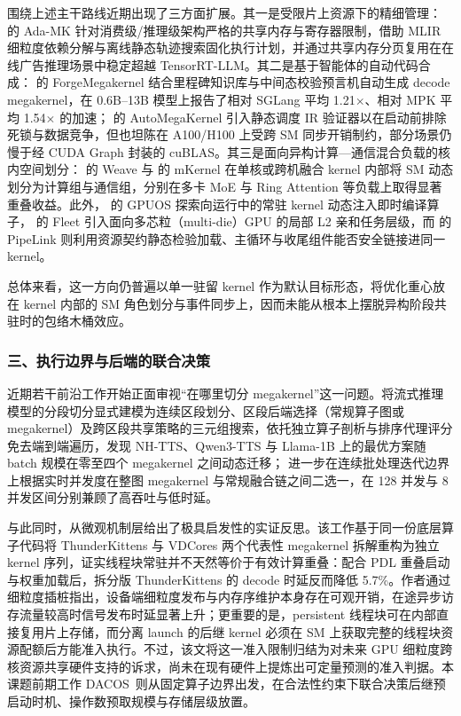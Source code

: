 围绕上述主干路线近期出现了三方面扩展。其一是受限片上资源下的精细管理： 的 Ada-MK 针对消费级/推理级架构严格的共享内存与寄存器限制，借助 MLIR 细粒度依赖分解与离线静态轨迹搜索固化执行计划，并通过共享内存分页复用在在线广告推理场景中稳定超越 TensorRT-LLM。其二是基于智能体的自动代码合成： 的 ForgeMegakernel 结合里程碑知识库与中间态校验预言机自动生成 decode megakernel，在 0.6B--13B 模型上报告了相对 SGLang 平均 1.21$\times$、相对 MPK 平均 1.54$\times$ 的加速； 的 AutoMegaKernel 引入静态调度 IR 验证器以在启动前排除死锁与数据竞争，但也坦陈在 A100/H100 上受跨 SM 同步开销制约，部分场景仍慢于经 CUDA Graph 封装的 cuBLAS。其三是面向异构计算—通信混合负载的核内空间划分： 的 Weave 与  的 mKernel 在单核或跨机融合 kernel 内部将 SM 动态划分为计算组与通信组，分别在多卡 MoE 与 Ring Attention 等负载上取得显著重叠收益。此外， 的 GPUOS 探索向运行中的常驻 kernel 动态注入即时编译算子， 的 Fleet 引入面向多芯粒（multi-die）GPU 的局部 L2 亲和任务层级，而  的 PipeLink 则利用资源契约静态检验加载、主循环与收尾组件能否安全链接进同一 kernel。

总体来看，这一方向仍普遍以单一驻留 kernel 作为默认目标形态，将优化重心放在 kernel 内部的 SM 角色划分与事件同步上，因而未能从根本上摆脱异构阶段共驻时的包络木桶效应。

\subsubsection*{三、执行边界与后端的联合决策}

近期若干前沿工作开始正面审视“在哪里切分 megakernel”这一问题。\cChat 将流式推理模型的分段切分显式建模为连续区段划分、区段后端选择（常规算子图或 megakernel）及跨区段共享策略的三元组搜索，依托独立算子剖析与排序代理评分免去端到端遍历，发现 NH-TTS、Qwen3-TTS 与 Llama-1B 上的最优方案随 batch 规模在零至四个 megakernel 之间动态迁移； 进一步在连续批处理迭代边界上根据实时并发度在整图 megakernel 与常规融合链之间二选一，在 128 并发与 8 并发区间分别兼顾了高吞吐与低时延。

与此同时，\cQiang 从微观机制层给出了极具启发性的实证反思。该工作基于同一份底层算子代码将 ThunderKittens 与 VDCores 两个代表性 megakernel 拆解重构为独立 kernel 序列，证实线程块常驻并不天然等价于有效计算重叠：配合 PDL 重叠启动与权重加载后，拆分版 ThunderKittens 的 decode 时延反而降低 5.7\%。作者通过细粒度插桩指出，设备端细粒度发布与内存序维护本身存在可观开销，在途异步访存流量较高时信号发布时延显著上升；更重要的是，persistent 线程块可在内部直接复用片上存储，而分离 launch 的后继 kernel 必须在 SM 上获取完整的线程块资源配额后方能准入执行。不过，该文将这一准入限制归结为对未来 GPU 细粒度跨核资源共享硬件支持的诉求，尚未在现有硬件上提炼出可定量预测的准入判据。本课题前期工作 DACOS~\pDacos 则从固定算子边界出发，在合法性约束下联合决策后继预启动时机、操作数预取规模与存储层级放置。

